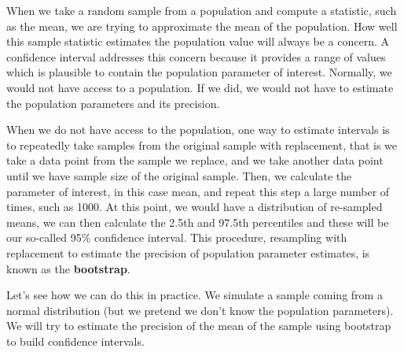 \documentclass[12pt,]{krantz}
\theoremstyle{definition}
\theoremstyle{definition}
\theoremstyle{definition}
\theoremstyle{remark}
\begin{document}
When we take a random sample from a population and compute a statistic,
such as the mean, we are trying to approximate the mean of the
population. How well this sample statistic estimates the population
value will always be a concern. A confidence interval addresses this
concern because it provides a range of values which is plausible to
contain the population parameter of interest. Normally, we would not
have access to a population. If we did, we would not have to estimate
the population parameters and its precision.

When we do not have access to the population, one way to estimate
intervals is to repeatedly take samples from the original sample with
replacement, that is we take a data point from the sample we replace,
and we take another data point until we have sample size of the original
sample. Then, we calculate the parameter of interest, in this case mean,
and repeat this step a large number of times, such as 1000. At this
point, we would have a distribution of re-sampled means, we can then
calculate the 2.5th and 97.5th percentiles and these will be our
so-called 95\% confidence interval. This procedure, resampling with
replacement to estimate the precision of population parameter estimates,
is known as the \textbf{bootstrap}.

Let's see how we can do this in practice. We simulate a sample coming
from a normal distribution (but we pretend we don't know the population
parameters). We will try to estimate the precision of the mean of the
sample using bootstrap to build confidence intervals.
\end{document}
